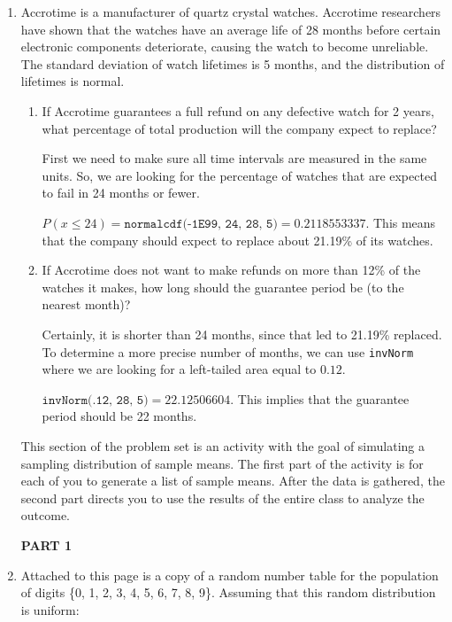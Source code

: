 \documentclass{article}
\newcommand{\answer}[1]{\color{white}#1}
\begin{document}
\begin{enumerate}
\item Accrotime is a manufacturer of quartz crystal watches. Accrotime researchers have shown that the watches have an average life of 28 months before certain electronic components deteriorate, causing the watch to become unreliable.  The standard deviation of watch lifetimes is 5 months, and the distribution of lifetimes is normal.

	\begin{enumerate}
	
	\item If Accrotime guarantees a full refund on any defective watch for 2 years, what percentage of total production will the company expect to replace? 
	
	{\answer First we need to make sure all time intervals are measured in the same units.  So, we are looking for the percentage of watches that are expected to fail in 24 months or fewer. 
	
	$P(x\leq 24) = \texttt{normalcdf(-1E99, 24, 28, 5)} = 0.2118553337$.  This means that the company should expect to replace about 21.19\% of its watches.
	} 

	\item If Accrotime does not want to make refunds on more than 12\% of the watches it makes, how long should the guarantee period be (to the nearest month)? 
	
	{\answer Certainly, it is shorter than 24 months, since that led to 21.19\% replaced.  To determine a more precise number of months, we can use \texttt{invNorm} where we are looking for a left-tailed area equal to $0.12$. 
	
	$\texttt{invNorm(.12, 28, 5)} = 22.12506604$.  This implies that the guarantee period should be 22 months.
	} 

	\end{enumerate}

This section of the problem set is an activity with the goal of simulating a sampling distribution of sample means. The first part of the activity is for each of you to generate a list of sample means. After the data is gathered, the second part directs you to use the results of the entire class to analyze the outcome.

\textbf{PART 1}


\item Attached to this page is a copy of a random number table for the population of digits \{0, 1, 2, 3, 4, 5, 6, 7, 8, 9\}. Assuming that this random distribution is uniform:


\end{enumerate}
\end{document}
